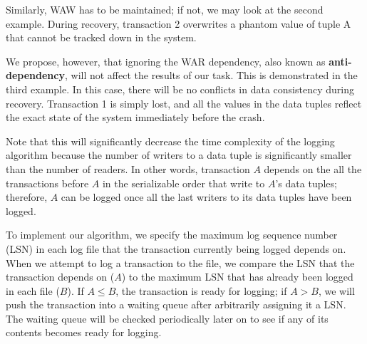 Similarly, WAW has to be maintained; if not, we may look at the second example. During recovery, transaction 2 overwrites a phantom value of tuple A that cannot be tracked down in the system. 

We propose, however, that ignoring the WAR dependency, also known as  \textbf{anti-dependency}, will not affect the results of our task. This is demonstrated in the third example. In this case, there will be no conflicts in data consistency during recovery. Transaction 1 is simply lost, and all the values in the data tuples reflect the exact state of the system immediately before the crash. \par

Note that this will significantly decrease the time complexity of the logging algorithm because the number of writers to a data tuple is significantly smaller than the number of readers. In other words, transaction $A$ depends on the all the transactions before $A$ in the serializable order that write to $A$'s data tuples; therefore, $A$ can be logged once all the last writers to its data tuples have been logged. \par

To implement our algorithm, we specify the maximum log sequence number (LSN) in each log file that the transaction currently being logged depends on. When we attempt to log a transaction to the file, we compare the LSN that the transaction depends on ($A$) to the maximum LSN that has already been logged in each file ($B$). If $A\leq B$, the transaction is ready for logging; if $A>B$, we will push the transaction into a waiting queue after arbitrarily assigning it a LSN. The waiting queue will be checked periodically later on to see if any of its contents becomes ready for logging.\par

